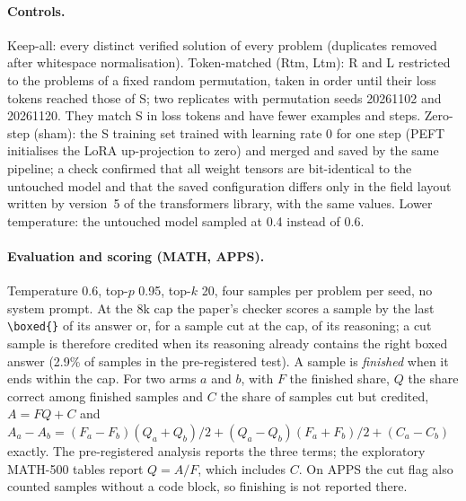 \documentclass[10pt]{article}
\begin{document}
\paragraph{Controls.} Keep-all: every distinct verified solution of every problem (duplicates removed after whitespace normalisation). Token-matched (Rtm, Ltm): R and L restricted to the problems of a fixed random permutation, taken in order until their loss tokens reached those of S; two replicates with permutation seeds 20261102 and 20261120. They match S in loss tokens and have fewer examples and steps. Zero-step (sham): the S training set trained with learning rate 0 for one step (PEFT initialises the LoRA up-projection to zero) and merged and saved by the same pipeline; a check confirmed that all weight tensors are bit-identical to the untouched model and that the saved configuration differs only in the field layout written by version~5 of the transformers library, with the same values. Lower temperature: the untouched model sampled at 0.4 instead of 0.6.

\paragraph{Evaluation and scoring (MATH, APPS).} Temperature 0.6, top-$p$ 0.95, top-$k$ 20, four samples per problem per seed, no system prompt. At the 8k cap the paper's checker scores a sample by the last \texttt{\textbackslash boxed\{\}} of its answer or, for a sample cut at the cap, of its reasoning; a cut sample is therefore credited when its reasoning already contains the right boxed answer (2.9\% of samples in the pre-registered test). A sample is \emph{finished} when it ends within the cap. For two arms $a$ and $b$, with $F$ the finished share, $Q$ the share correct among finished samples and $C$ the share of samples cut but credited, $A=FQ+C$ and $A_a-A_b=(F_a-F_b)(Q_a+Q_b)/2+(Q_a-Q_b)(F_a+F_b)/2+(C_a-C_b)$ exactly. The pre-registered analysis reports the three terms; the exploratory MATH-500 tables report $Q=A/F$, which includes $C$. On APPS the cut flag also counted samples without a code block, so finishing is not reported there.
\end{document}
